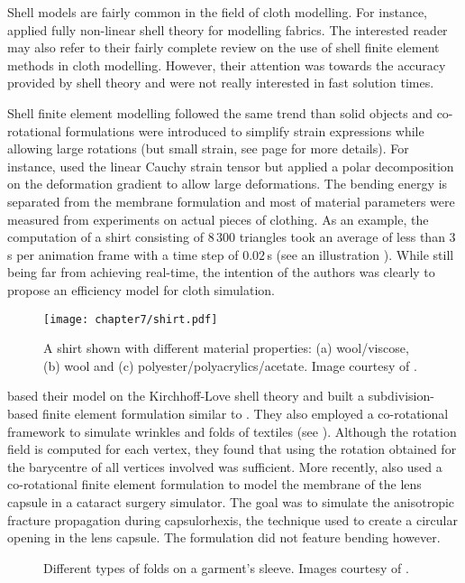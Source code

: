 Shell models are fairly common in the field of cloth modelling. For instance, \cite{Eischen96} applied fully non-linear shell theory for modelling fabrics. The interested reader may also refer to their fairly complete review on the use of shell finite element methods in cloth modelling. However, their attention was towards the accuracy provided by shell theory and were not really interested in fast solution times. 

Shell finite element modelling followed the same trend than solid objects and co-rotational formulations were introduced to simplify strain expressions while allowing large rotations (but small strain, see page \pageref{chap4:corotationalMethods} for more details). For instance, \cite{Etzmuss03} used the linear Cauchy strain tensor but applied a polar decomposition on the deformation gradient to allow large deformations. The bending energy is separated from the membrane formulation and most of material parameters were measured from experiments on actual pieces of clothing. As an example, the computation of a shirt consisting of $ 8\,300 $ triangles took an average of less than $ 3\,$s per animation frame with a time step of $ 0.02\,$s (see an illustration ). While still being far from achieving real-time, the intention of the authors was clearly to propose an efficiency model for cloth simulation. 
%
\begin{figure}[ht]
\begin{center}
\texttt{[image: chapter7/shirt.pdf]}
\caption[A shirt shown with different material properties]{A shirt shown with different material properties: (a) wool/viscose, (b) wool and (c) polyester/polyacrylics/acetate. Image courtesy of \cite{Etzmuss03}.}
\label{chap7:fig-shirt}
\end{center}
\end{figure}

\cite{Thomaszewski06} based their model on the Kirchhoff-Love shell theory and built a subdivision-based finite element formulation similar to \cite{Cirak00}.  They also employed a co-rotational framework to simulate wrinkles and folds of textiles (see ). Although the rotation field is computed for each vertex, they found that using the rotation obtained for the barycentre of all vertices involved was sufficient. More recently, \cite{Allard09} also used a co-rotational finite element formulation to model the membrane of the lens capsule in a cataract surgery simulator. The goal was to simulate the anisotropic fracture propagation during capsulorhexis, the technique used to create a circular opening in the lens capsule. The formulation did not feature bending however. 
%
\begin{figure}[ht]
\centering 
{}
\hfill 
{}
\hfill 
{}
\caption[Different types of folds on a garment's sleeve ]{Different types of folds on a garment's sleeve. Images courtesy of \cite{Thomaszewski06}.}
\label{chap7:fig-sleeve}
\end{figure}

